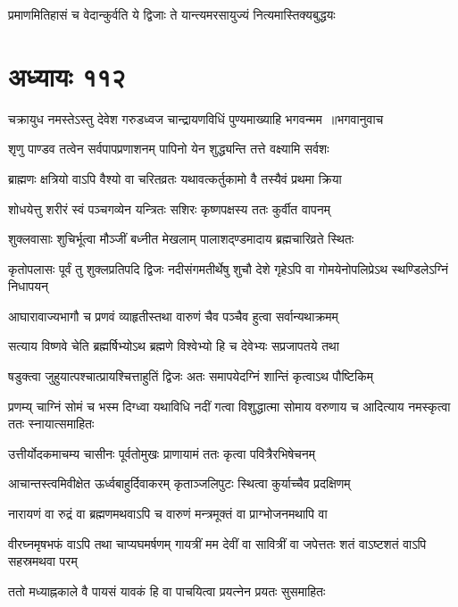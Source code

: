 \twolineshloka
{प्रमाणमितिहासं च वेदान्कुर्वति ये द्विजाः}
{ते यान्त्यमरसायुज्यं नित्यमास्तिक्यबुद्धयः}


\chapter{अध्यायः ११२}
\threelineshloka
{चक्रायुध नमस्तेऽस्तु देवेश गरुडध्वज}
{चान्द्रायणविधिं पुण्यमाख्याहि भगवन्मम ॥भगवानुवाच}
{}


\twolineshloka
{शृणु पाण्डव तत्वेन सर्वपापप्रणाशनम्}
{पापिनो येन शुद्ध्यन्ति तत्ते वक्ष्यामि सर्वशः}


\twolineshloka
{ब्राह्मणः क्षत्रियो वाऽपि वैश्यो वा चरितव्रतः}
{यथावत्कर्तुकामो वै तस्यैवं प्रथमा क्रिया}


\twolineshloka
{शोधयेत्तु शरीरं स्वं पञ्चगव्येन यन्त्रितः}
{सशिरः कृष्णपक्षस्य ततः कुर्वीत वापनम्}


\twolineshloka
{शुक्लवासाः शुचिर्भूत्वा मौञ्जीं बध्नीत मेखलाम्}
{पालाशद्ण्डमादाय ब्रह्मचारिव्रते स्थितः}


\threelineshloka
{कृतोपलासः पूर्वं तु शुक्लप्रतिपदि द्विजः}
{नदीसंगमतीर्थेषु शुचौ देशे गृहेऽपि वा}
{गोमयेनोपलिप्रेऽथ स्थण्डिलेऽग्निं निधापयन्}


\twolineshloka
{आघारावाज्यभागौ च प्रणवं व्याहृतीस्तथा}
{वारुणं चैव पञ्चैव हुत्वा सर्वान्यथाक्रमम्}


\twolineshloka
{सत्याय विष्णवे चेति ब्रह्मर्षिभ्योऽथ ब्रह्मणे}
{विश्वेभ्यो हि च देवेभ्यः सप्रजापतये तथा}


\twolineshloka
{षडुक्त्वा जुहुयात्पश्चात्प्रायश्चित्ताहुतिं द्विजः}
{अतः समापयेदग्निं शान्तिं कृत्वाऽथ पौष्टिकिम्}


\threelineshloka
{प्रणम्य् चाग्निं सोमं च भस्म दिग्ध्वा यथाविधि}
{नदीं गत्वा विशुद्धात्मा सोमाय वरुणाय च}
{आदित्याय नमस्कृत्वा ततः स्नायात्समाहितः}


\twolineshloka
{उत्तीर्योदकमाचम्य चासीनः पूर्वतोमुखः}
{प्राणायामं ततः कृत्वा पवित्रैरभिषेचनम्}


\twolineshloka
{आचान्तस्त्वमिवीक्षेत ऊर्ध्वबाहुर्दिवाकरम्}
{कृताञ्जलिपुटः स्थित्वा कुर्याच्चैव प्रदक्षिणम्}


\twolineshloka
{नारायणं वा रुद्रं वा ब्रह्मणमथवाऽपि च}
{वारुणं मन्त्रमूक्तं वा प्राग्भोजनमथापि वा}


\threelineshloka
{वीरघ्नमृषभफं वाऽपि तथा चाप्यघमर्षणम्}
{गायत्रीं मम देवीं वा सावित्रीं वा जपेत्ततः}
{शतं वाऽष्टशतं वाऽपि सहस्रमथवा परम्}


\twolineshloka
{ततो मध्याह्नकाले वै पायसं यावकं हि वा}
{पाचयित्वा प्रयत्नेन प्रयतः सुसमाहितः}


